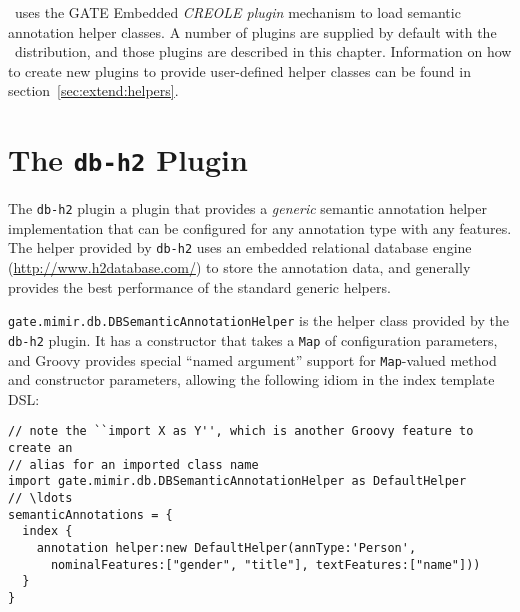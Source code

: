 \Mimir\ uses the GATE Embedded {\em CREOLE plugin} mechanism to load semantic
annotation helper classes.  A number of plugins are supplied by default with
the \Mimir\ distribution, and those plugins are described in this chapter.
Information on how to create new plugins to provide user-defined helper classes
can be found in section~\ref{sec:extend:helpers}.

\section{The {\tt db-h2} Plugin}\label{sec:plugins:db}

The {\tt db-h2} plugin a plugin that provides a {\em generic} semantic
annotation helper implementation that can be configured for any annotation type
with any features.  The helper provided by {\tt db-h2} uses an embedded
relational database engine (\url{http://www.h2database.com/}) to store the
annotation data, and generally provides the best performance of the standard
generic helpers.

\lstinline!gate.mimir.db.DBSemanticAnnotationHelper! is the helper class
provided by the {\tt db-h2} plugin.  It has a constructor that takes a
{\tt Map} of configuration parameters, and Groovy provides special ``named
argument'' support for {\tt Map}-valued method and constructor parameters,
allowing the following idiom in the index template DSL:
\begin{lstlisting}[texcl, breaklines, breakindent=150pt]
// note the ``import X as Y'', which is another Groovy feature to create an
// alias for an imported class name
import gate.mimir.db.DBSemanticAnnotationHelper as DefaultHelper
// \ldots
semanticAnnotations = {
  index {
    annotation helper:new DefaultHelper(annType:'Person',
      nominalFeatures:["gender", "title"], textFeatures:["name"]))
  }
}
\end{lstlisting}

